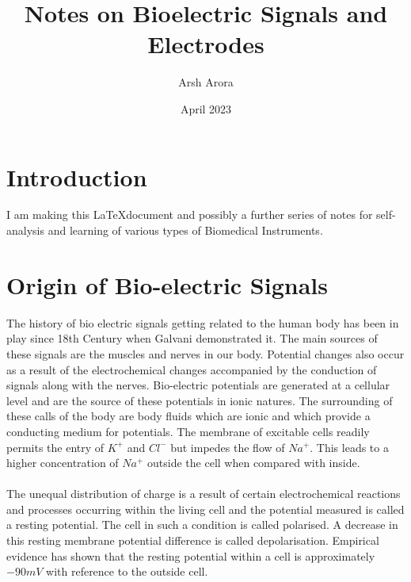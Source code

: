 \documentclass{article}
\title{Notes on Bioelectric Signals and Electrodes}
\author{Arsh Arora}
\date{April 2023}
\begin{document}
\maketitle

\section{Introduction}
I am making this \LaTeX document and possibly a further series of notes for self-analysis and learning of various types of Biomedical Instruments.
\section{Origin of Bio-electric Signals}
The history of bio electric signals getting related to the human body has been in play since 18th Century when Galvani demonstrated it. The main sources of these signals are the muscles and nerves in our body. Potential changes also occur as a result of the electrochemical changes accompanied by the conduction of signals along with the nerves. Bio-electric potentials are generated at a cellular level and are the source of these potentials in ionic natures. The surrounding of these calls of the body are body fluids which are ionic and which provide a conducting medium for potentials. The membrane of excitable cells readily permits the entry of $K^+$ and $Cl^-$ but impedes the flow of $Na^+$. This leads to a higher concentration of $Na^+$ outside the cell when compared with inside.\\
\\
The unequal distribution of charge is a result of certain electrochemical reactions and processes occurring within the living cell and the potential measured is called a resting potential. The cell in such a condition is called polarised. A decrease in this resting membrane potential difference is called depolarisation.
Empirical evidence has shown that the resting potential within a cell is approximately $-90 mV$ with reference to the outside cell.\newpage
\end{document}
